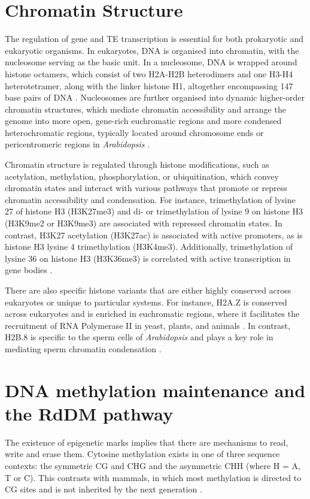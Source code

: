 \section{Chromatin Structure}

The regulation of gene and TE transcription is essential for both prokaryotic and eukaryotic organisms. In eukaryotes, DNA is organised into chromatin, with the nucleosome serving as the basic unit. In a nucleosome, DNA is wrapped around histone octamers, which consist of two H2A-H2B heterodimers and one H3-H4 heterotetramer, along with the linker histone H1, altogether encompassing 147 base pairs of DNA \cite{RN294}. Nucleosomes are further organised into dynamic higher-order chromatin structures, which mediate chromatin accessibility and arrange the genome into more open, gene-rich euchromatic regions and more condensed heterochromatic regions, typically located around chromosome ends or pericentromeric regions in \textit{Arabidopsis} \cite{RN299}. 

Chromatin structure is regulated through histone modifications, such as acetylation, methylation, phosphorylation, or ubiquitination, which convey chromatin states and interact with various pathways that promote or repress chromatin accessibility and condensation.  For instance, trimethylation of lysine 27 of histone H3 (H3K27me3) and di- or trimethylation of lysine 9 on histone H3 (H3K9me2 or H3K9me3) are associated with repressed chromatin states. In contrast, H3K27 acetylation (H3K27ac) is associated with active promoters, as is histone H3 lysine 4 trimethylation (H3K4me3). Additionally, trimethylation of lysine 36 on histone H3 (H3K36me3) is correlated with active transcription in gene bodies \cite{RN297,RN298}. 

There are also specific histone variants that are either highly conserved across eukaryotes or unique to particular systems. For instance, H2A.Z is conserved across eukaryotes and is enriched in euchromatic regions, where it facilitates the recruitment of RNA Polymerase II in yeast, plants, and animals \cite{RN295,RN296}. In contrast, H2B.8 is specific to the sperm cells of \textit{Arabidopsis} and plays a key role in mediating sperm chromatin condensation \cite{RN285}.

\section{DNA methylation maintenance and the RdDM pathway} 

The existence of epigenetic marks implies that there are mechanisms to read, write and erase them. Cytosine methylation exists in one of three sequence contexts: the symmetric CG and CHG and the asymmetric CHH (where H = A, T or C).  This contrasts with mammals, in  which most methylation is directed to CG sites  and is not inherited by the next generation \cite{RN228}. 

